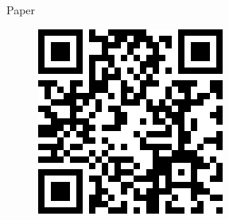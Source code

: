 \documentclass[final,20pt]{beamer}
\newlength{\sepwidth}
\newlength{\colwidth}
\newcommand{\separatorcolumn}{\begin{column}{\sepwidth}\end{column}}
\begin{document}
\begin{frame}[t]
\begin{columns}[t]
\begin{column}{\colwidth}
\begin{block}{Paper}
\begin{figure}
\centering
\includegraphics[scale=1.0]{img/hc-doi.png}
\end{figure}

\end{block}

\end{column}

\separatorcolumn
\end{columns}

\end{frame}
\end{document}
